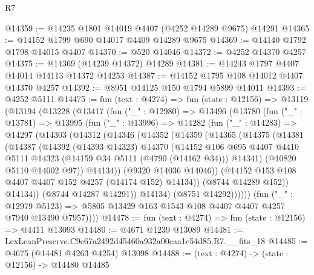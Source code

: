 \begin{lexlean}{R7}
\begin{coremodule}
@14359 := @14235 @1801 @14019 @4407 (@4252 @14289 @9675) @14291
@14365 := @14152 @1799 @690 @14017 @4409 @14289 @9675
@14369 := @14140 @1792 @1798 @14015 @4407
@14370 := @520 @14046
@14372 := @4252 @14370 @4257
@14375 := @14369 (@14239 @14372) @14289
@14381 := @14243 @1797 @4407 @14014 @14113 @14372 @14253
@14387 := @14152 @1795 @108 @14012 @4407 @14370 @4257
@14392 := @8951 @14125 @150 @1794 @5899 @14011
@14393 := @4252 @5111
@14475 := fun (text : @4274) =>
  fun (state : @12156) =>
  @13119
    (@13194
      (@13228
        (@13417
          (fun ("_" : @12980) =>
          @13496
            (@13780
              (fun ("_" : @13781) =>
              @13995
                (fun ("_" : @13996) =>
                @14282
                  (fun ("_" : @14283) =>
                  @14297
                    (@14303
                      (@14312
                        (@14346
                          (@14352
                            (@14359
                              (@14365
                                (@14375
                                  (@14381
                                    (@14387
                                      (@14392
                                        (@14393 @14323)
                                        @14370
                                        (@14152
                                          @106
                                          @695
                                          @4407
                                          @4410
                                          @5111
                                          @14323
                                          (@14159 @34 @5111 (@4790 (@14162 @34)))
                                          @14341)
                                        (@10820 @5110 @14002 @97))
                                      @14134))
                                  (@9320 @14036 @14046))
                                (@14152 @153 @108 @4407 @4407 @152 @4257 (@14174 @152) @14134))
                              (@8744 @14289 @152))
                            @14134))
                        (@8744 @14287 @14291))
                      @14134)
                    (@8751 @14292))))))
          (fun ("_" : @12979 @5123) =>
          @5805 @13429 @163 @1543 @108 @4407 @4407 @4257 @7940 @13490 @7957))))
@14478 := fun (text : @4274) => fun (state : @12156) => @4411 @13093
@14480 := @4671 @1239 @13089
@14481 := LexLeanPreserve.C9e67a2492d45460a932a00caa1c54d85.R7.__fits_18
@14485 := @4675 (@14481 @4263 @4254) @13098
@14488 := (text : @4274) -> (state : @12156) -> @14480 @14485

\end{coremodule}
\end{lexlean}

